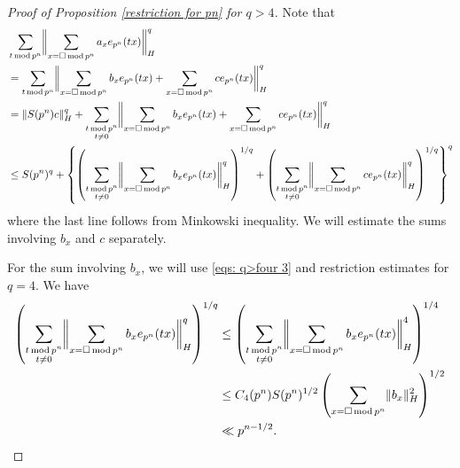 \documentclass[11pt]{amsart}
\theoremstyle{plain} %
\theoremstyle{remark}
\numberwithin{equation}{section}
\DeclarePairedDelimiter\norm{\lVert}{\rVert}
\newcommand{\sqp}[1]{\sum_{#1=\square\,\mathrm{mod}\,p^n}}
\newcommand{\ap}[1]{\sum_{#1\,\mathrm{mod}\,p^n}}
\begin{document}
\begin{proof}[Proof of Proposition \ref{restriction for pn} for $q>4$]
    Note that
    \begin{equation}\label{eqs: q>four 4}
        \begin{split}
            &\ap{t} \norm[\bigg]{\sqp{x}a_xe_{p^n}(tx)}_H^q\\
            &=\ap{t} \norm[\bigg]{\sqp{x}b_xe_{p^n}(tx)+\sqp{x}ce_{p^n}(tx)}_H^q\\
            &=\norm{S(p^n)c}^q_H+\sum_{\substack{t\,\mathrm{mod}\,p^n\\t\neq 0}} \norm[\bigg]{\sqp{x}b_xe_{p^n}(tx)+\sqp{x}ce_{p^n}(tx)}_H^q\\
            &\leq S(p^n)^q+\left\{\left(\sum_{\substack{t\,\mathrm{mod}\,p^n\\t\neq 0}} \norm[\bigg]{\sqp{x}b_xe_{p^n}(tx)}_H^q\right)^{1/q}+\left(\sum_{\substack{t\,\mathrm{mod}\,p^n\\t\neq 0}} \norm[\bigg]{\sqp{x}ce_{p^n}(tx)}_H^q\right)^{1/q}\right\}^q
        \end{split}
    \end{equation}
    where the last line follows from Minkowski inequality. We will estimate the sums involving $b_x$ and $c$ separately.

    For the sum involving $b_x$, we will use \eqref{eqs: q>four 3} and restriction estimates for $q=4$. We have
    \begin{equation}\label{eqs: q>four 5}
        \begin{split}
            \left(\sum_{\substack{t\,\mathrm{mod}\,p^n\\t\neq 0}} \norm[\bigg]{\sqp{x}b_xe_{p^n}(tx)}_H^q\right)^{1/q}&\leq \left(\sum_{\substack{t\,\mathrm{mod}\,p^n\\t\neq 0}} \norm[\bigg]{\sqp{x}b_xe_{p^n}(tx)}_H^4\right)^{1/4}\\
            &\leq C_4(p^n)S(p^n)^{1/2}\left(\sqp{x}\norm{b_x}^2_H\right)^{1/2}\\
            &\ll p^{n-1/2}.
        \end{split}
    \end{equation}


\end{proof}
\end{document}
